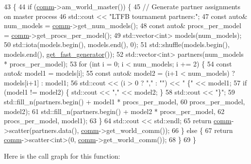 \begin{DoxyCode}
43                                       \{
44   \textcolor{keywordflow}{if} (\hyperlink{file__io_8cpp_ab048c6f9fcbcfaa57ce68b00263dbebe}{comm}->am\_world\_master()) \{
45     \textcolor{comment}{// Generate partner assignments on master process}
46     std::cout << \textcolor{stringliteral}{"LTFB tournament partners:"};
47     \textcolor{keyword}{const} \textcolor{keyword}{auto}& num\_models = \hyperlink{file__io_8cpp_ab048c6f9fcbcfaa57ce68b00263dbebe}{comm}->get\_num\_models();
48     \textcolor{keyword}{const} \textcolor{keyword}{auto}& procs\_per\_model = \hyperlink{file__io_8cpp_ab048c6f9fcbcfaa57ce68b00263dbebe}{comm}->get\_procs\_per\_model();
49     std::vector<int> models(num\_models);
50     std::iota(models.begin(), models.end(), 0);
51     std::shuffle(models.begin(), models.end(), \hyperlink{namespacelbann_ae6ce9c2fdec6f81803f6b1a6555c31c5}{get\_fast\_generator}());
52     std::vector<int> partners(num\_models * procs\_per\_model);
53     \textcolor{keywordflow}{for} (\textcolor{keywordtype}{int} i = 0; i < num\_models; i += 2) \{
54       \textcolor{keyword}{const} \textcolor{keyword}{auto}& model1 = models[i];
55       \textcolor{keyword}{const} \textcolor{keyword}{auto}& model2 = (i+1 < num\_models) ? models[i+1] : model1;
56       std::cout << (i > 0 ? \textcolor{stringliteral}{","} : \textcolor{stringliteral}{""}) << \textcolor{stringliteral}{" \{"} << model1;
57       \textcolor{keywordflow}{if} (model1 != model2) \{ std::cout << \textcolor{stringliteral}{","} << model2; \}
58       std::cout << \textcolor{stringliteral}{"\}"};
59       std::fill\_n(partners.begin() + model1 * procs\_per\_model,
60                   procs\_per\_model, model2);
61       std::fill\_n(partners.begin() + model2 * procs\_per\_model,
62                   procs\_per\_model, model1);
63     \}
64     std::cout << std::endl;
65     \textcolor{keywordflow}{return} \hyperlink{file__io_8cpp_ab048c6f9fcbcfaa57ce68b00263dbebe}{comm}->scatter(partners.data(), \hyperlink{file__io_8cpp_ab048c6f9fcbcfaa57ce68b00263dbebe}{comm}->get\_world\_comm());
66   \} \textcolor{keywordflow}{else} \{
67     \textcolor{keywordflow}{return} \hyperlink{file__io_8cpp_ab048c6f9fcbcfaa57ce68b00263dbebe}{comm}->scatter<\textcolor{keywordtype}{int}>(0, \hyperlink{file__io_8cpp_ab048c6f9fcbcfaa57ce68b00263dbebe}{comm}->get\_world\_comm());
68   \}
69 \}
\end{DoxyCode}
Here is the call graph for this function\+:\nopagebreak
